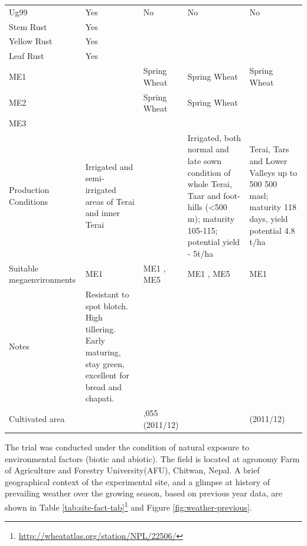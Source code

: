 \documentclass[12pt,oneside]{dukestatscithesis} %
\begin{document}
\begin{longtable}[t]{>{\centering\arraybackslash}p{2.0cm}>{\centering\arraybackslash}p{3.2cm}>{\centering\arraybackslash}p{3.2cm}>{\centering\arraybackslash}p{3.2cm}>{\centering\arraybackslash}p{3.2cm}}
Ug99 & Yes & No & No & No\\
Stem Rust & Yes &  &  & \\
Yellow Rust & Yes &  &  & \\
Leaf Rust & Yes &  &  & \\
\addlinespace
ME1 &  & Spring Wheat & Spring Wheat & Spring Wheat\\
ME2 &  & Spring Wheat & Spring Wheat & \\
ME3 &  &  &  & \\
Production Conditions & Irrigated and semi-irrigated areas of Terai and inner Terai &  & Irrigated, both normal and late sown condition of whole Terai, Taar and foot-hills (<500 m); maturity 105-115; potential yield - 5t/ha & Terai, Tars and Lower Valleys up to 500 500 masl; maturity 118 days, yield potential 4.8 t/ha\\
Suitable megaenvironments & ME1 & ME1 , ME5 & ME1 , ME5 & ME1\\
\addlinespace
Notes & Resistant to spot blotch. High tillering. Early maturing, stay green, excellent for bread and chapati. &  &  & \\
Cultivated area &  & 153,055 (2011/12) &  & 38263 (2011/12)\\
\bottomrule
\end{longtable}
\endgroup{}

The trial was conducted under the condition of natural exposure to environmental factors (biotic and abiotic). The field is located at agronomy Farm of Agriculture and Forestry University(AFU), Chitwan, Nepal. A brief geographical context of the experimental site, and a glimpse at history of prevailing weather over the growing season, based on previous year data, are shown in Table \ref{tab:site-fact-tab}\footnote{\url{http://wheatatlas.org/station/NPL/22506/}} and Figure \ref{fig:weather-previous}.
\end{document}

